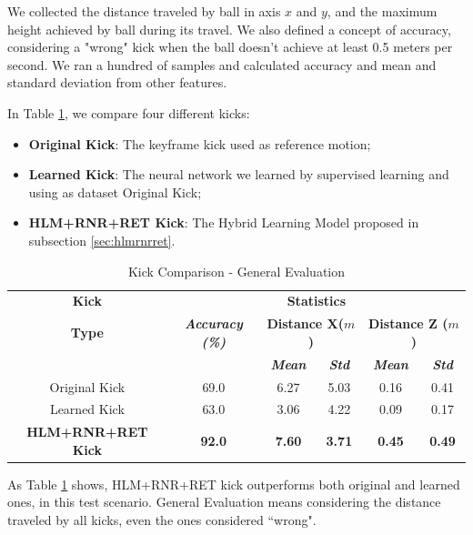 We collected the distance traveled by ball in axis $x$ and $y$, and the maximum height achieved by ball during its travel. We also defined a concept of accuracy, considering a "wrong" kick when the ball doesn't achieve at least 0.5 meters per second. We ran a hundred of samples and calculated accuracy and mean and standard deviation from other features.

In Table \ref{tab:finaltest}, we compare four different kicks:

\begin{itemize}
	\item \textbf{Original Kick}: The keyframe kick used as reference motion;
	\item \textbf{Learned Kick}: The neural network we learned by supervised learning and using as dataset Original Kick;
	\item \textbf{HLM+RNR+RET Kick}: The Hybrid Learning Model proposed in subsection \ref{sec:hlmrnrret}.
\end{itemize}

\begin{table}[!htbp]
	\caption{Kick Comparison - General Evaluation}
	\begin{center} 
		\begin{tabular}{|c|c|c|c|c|c|}
			\hline
			\textbf{Kick}&\multicolumn{5}{|c|}{\textbf{Statistics}} \\
			\cline{2-6} 
			\textbf{Type} & \textbf{\textit{Accuracy (\%)}}& \multicolumn{2}{|c|}{\textbf{Distance X(\(m\))}}& 
			\multicolumn{2}{|c|}{\textbf{Distance Z (\(m\))}}\\
			\cline {3-6} 
			& & \textbf{\textit{Mean}}& \textbf{\textit{Std}}
			& \textbf{\textit{Mean}}& \textbf{\textit{Std}}\\
			\hline
			Original Kick & 69.0 & 6.27 & 5.03 & 0.16 & 0.41 \\
			\hline
			Learned Kick & 63.0 & 3.06 & 4.22 & 0.09 & 0.17 \\
			\hline
			\textbf{HLM+RNR+RET Kick}  & \textbf{92.0} & \textbf{7.60} & \textbf{3.71} & \textbf{0.45} & \textbf{0.49}  \\
			\hline
		\end{tabular}
		\label{tab:finaltest}
	\end{center}
\end{table}

As Table \ref{tab:finaltest} shows, HLM+RNR+RET kick outperforms both original and learned ones, in this test scenario. General Evaluation means considering the distance traveled by all kicks, even the ones considered ``wrong".

